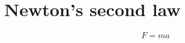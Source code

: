 \documentclass{article}
\begin{document}
\section{Newton's second law}

    $$
    F=ma
    $$
\end{document}
